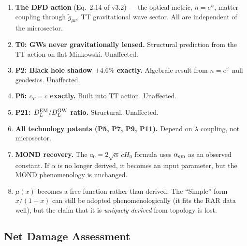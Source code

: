 \documentclass[11pt]{article}
\begin{document}
\begin{enumerate}
\item \textbf{The DFD action} (Eq.~2.14 of v3.2) --- the optical
  metric, $n = e^\psi$, matter coupling through $\tilde{g}_{\mu\nu}$,
  TT gravitational wave sector.  All are independent of the microsector.

\item \textbf{T0: GWs never gravitationally lensed.}  Structural
  prediction from the TT action on flat Minkowski.  Unaffected.

\item \textbf{P2: Black hole shadow $+4.6\%$ exactly.}  Algebraic
  result from $n = e^\psi$ null geodesics.  Unaffected.

\item \textbf{P5: $c_T = c$ exactly.}  Built into TT action.
  Unaffected.

\item \textbf{P21: $D_L^{\rm EM}/D_L^{\rm GW}$ ratio.}  Structural.
  Unaffected.

\item \textbf{All technology patents (P5, P7, P9, P11).}  Depend
  on $\lambda$ coupling, not microsector.

\item \textbf{MOND recovery.}  The $a_0 = 2\sqrt{\alpha}\,cH_0$
  formula uses $\alpha_{\rm em}$ as an observed constant.  If
  $\alpha$ is no longer derived, it becomes an input parameter,
  but the MOND phenomenology is unchanged.

\item \textbf{$\mu(x)$} becomes a free function rather than derived.
  The ``Simple'' form $x/(1+x)$ can still be adopted phenomenologically
  (it fits the RAR data well), but the claim that it is
  \emph{uniquely derived} from topology is lost.
\end{enumerate}

\subsection{Net Damage Assessment}
\end{document}
